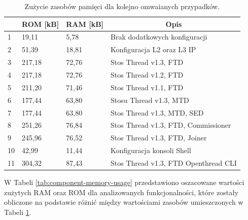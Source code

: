     \begin{table}[H]
        \centering
        \caption{Zużycie zasobów pamięci dla kolejno omwaianych przypadków.}
        \begin{tabular}{|l|l|l|l|}
            \hline
            \rowcolor{gray!20}
            \multicolumn{1}{|c|}{l.p.} & \multicolumn{1}{c|}{ROM [kB]} & \multicolumn{1}{c|}{RAM [kB]} & \multicolumn{1}{c|}{Opis} \\
            \hline
            1 & 19,11 & 5,78 & Brak dodatkowych konfiguracji\\
            \hline
            2 & 51,39 & 18,81 & Konfiguracja L2 oraz L3 IP\\
            \hline
            3 & 217,18 & 72,76 & Stos Thread v1.3, FTD\\
            \hline
            4 & 217,18 & 72,76 & Stos Thread v1.2, FTD\\
            \hline
            5 & 211,20 & 71,46 & Stos Thread v1.1, FTD\\
            \hline
            6 & 177,44 & 63,80 & Stosu Thread v1.3, MTD\\
            \hline
            7 & 177,44 & 63,80 & Stos Thread v1.3, MTD, SED\\
            \hline
            8 & 251,26 & 76,84 & Stos Thread v1.3, FTD, Commissioner\\
            \hline
            9 & 245,96 & 76,52 & Stos Thread v1.3, FTD, Joiner\\
            \hline
            10 & 42,99 & 11,44 & Konfiguracja konsoli Shell\\
            \hline
            11 & 304,32 & 87,43 & Stos Thread v1.3, FTD Openthread CLI \\
            \hline
        \end{tabular}
        \label{tab:memory-measures}
    \end{table}

    W Tabeli \ref{tab:component-memory-usage} przedstawiono oszacowane wartości zużytych RAM oraz ROM dla analizowanych funkcjonalności, które zostały obliczone na podstawie różnić między wartościami zasobów umieszczonych w Tabeli \ref{tab:memory-measures}.

